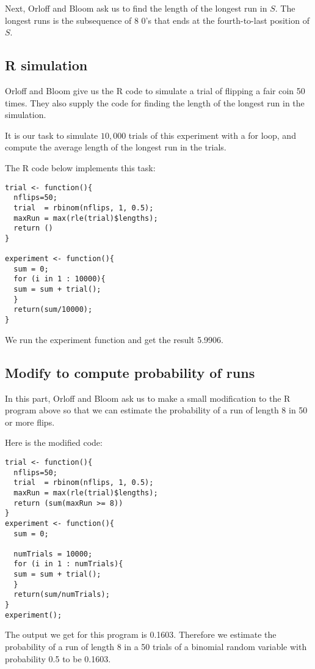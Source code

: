 \documentclass[a4paper,11pt]{article}
\begin{document}
Next, Orloff and Bloom ask us to find the length of the longest run
in $S$.  The longest runs is the subsequence of 8 0's that ends at the
fourth-to-last position of $S$.

\subsection{R simulation}

Orloff and Bloom give us the R code to simulate a trial of flipping
a fair coin 50 times.  They also supply the code for finding the
length of the longest run in the simulation.

It is our task to simulate $10,000$ trials of this experiment with a for
loop, and compute the average length of the longest run in the trials.

The R code below implements this task:

\begin{lstlisting}
trial <- function(){
  nflips=50;
  trial  = rbinom(nflips, 1, 0.5);
  maxRun = max(rle(trial)$lengths);
  return ()
}

experiment <- function(){
  sum = 0;
  for (i in 1 : 10000){
  sum = sum + trial();
  }
  return(sum/10000);
}
\end{lstlisting}

We run the experiment function and get the result 5.9906.

\subsection{Modify to compute probability of runs}

In this part, Orloff and Bloom ask us to make a small modification
to the R program above so that we can estimate the probability of
a run of length 8 in 50 or more flips.

Here is the modified code:

\begin{lstlisting}
trial <- function(){
  nflips=50;
  trial  = rbinom(nflips, 1, 0.5);
  maxRun = max(rle(trial)$lengths);
  return (sum(maxRun >= 8))
}
experiment <- function(){
  sum = 0;
  
  numTrials = 10000;
  for (i in 1 : numTrials){
  sum = sum + trial();
  }
  return(sum/numTrials);
}
experiment();
\end{lstlisting}

The output we get for this program is 0.1603.  Therefore we estimate
the probability of a run of length 8 in a 50 trials of a binomial random
variable with probability 0.5 to be 0.1603.

\printbibliography{}
\end{document}
